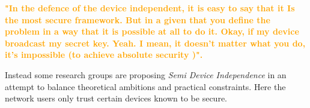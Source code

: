\documentclass[journal]{vgtc}
\begin{document}
\textcolor{orange}{\textbf{"In the defence of the device independent, it is easy to say  that it Is the most secure framework. But in a given that you define the problem in a way that it is possible at all to do it. Okay, if my device broadcast my secret key. Yeah. I mean, it doesn't matter what you do, it's impossible (to achieve absolute security )".}}

\vspace{0.3cm}

\noindent Instead some research groups are proposing \textit{Semi Device Independence} in an attempt to balance theoretical ambitions and practical constraints. Here the network users only trust certain devices known to be secure. 

  






  

\end{document}
